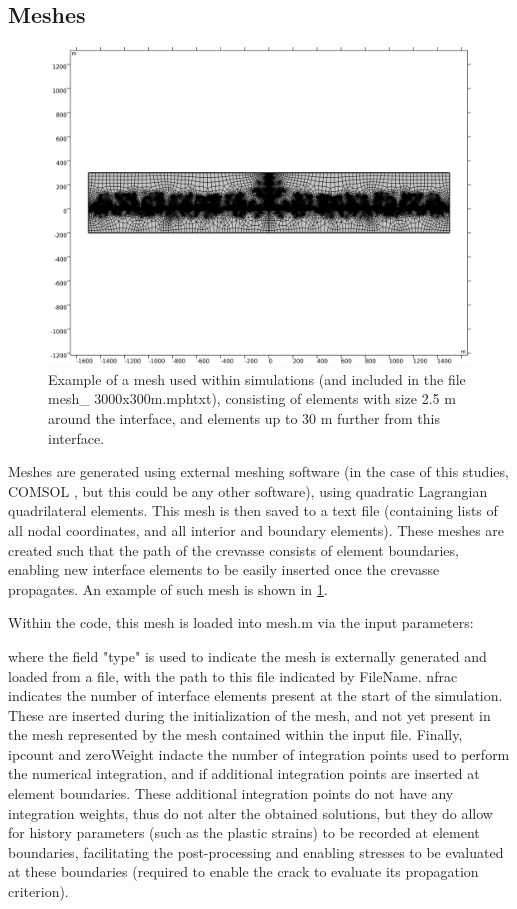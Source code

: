 \documentclass[3p]{elsarticle} %
\begin{document}
\subsection{Meshes}
\begin{figure}
	\centering
	\includegraphics[clip=true, width=12cm, trim={50 200 20 200}]{Figures/mesh.png}
	\caption{Example of a mesh used within simulations (and included in the file mesh\_ 3000x300m.mphtxt), consisting of elements with size 2.5 m around the interface, and elements up to 30 m further from this interface.}
	\label{fig:mesh}
\end{figure}
Meshes are generated using external meshing software (in the case of this studies, COMSOL \citep{COMSOL2020a}, but this could be any other software), using quadratic Lagrangian quadrilateral elements. This mesh is then saved to a text file (containing lists of all nodal coordinates, and all interior and boundary elements). These meshes are created such that the path of the crevasse consists of element boundaries, enabling new interface elements to be easily inserted once the crevasse propagates. An example of such mesh is shown in \cref{fig:mesh}. 

Within the code, this mesh is loaded into mesh.m via the input parameters:

where the field "type" is used to indicate the mesh is externally generated and loaded from a file, with the path to this file indicated by FileName. nfrac indicates the number of interface elements present at the start of the simulation. These are inserted during the initialization of the mesh, and not yet present in the mesh represented by the mesh contained within the input file. Finally, ipcount and zeroWeight indacte the number of integration points used to perform the numerical integration, and if additional integration points are inserted at element boundaries. These additional integration points do not have any integration weights, thus do not alter the obtained solutions, but they do allow for history parameters (such as the plastic strains) to be recorded at element boundaries, facilitating the post-processing and enabling stresses to be evaluated at these boundaries (required to enable the crack to evaluate its propagation criterion). 
\end{document}
